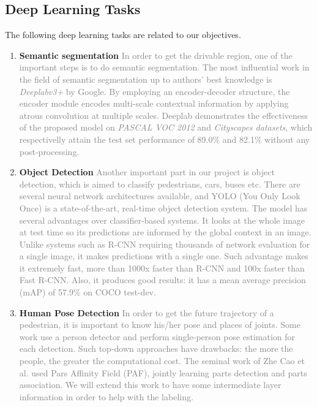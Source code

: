 \subsection{Deep Learning Tasks}
The following deep learning tasks are related to our objectives.
\begin{enumerate}
    \item \textbf{Semantic segmentation}\newline
\textcolor{gray}{In order to get the drivable region, one of the important steps is to do semantic segmentation.  The most influential work in the field of semantic segmentation up to authors' best knowledge is \textit{Deeplabv3+} by Google. By employing an encoder-decoder structure, the encoder module encodes multi-scale contextual information by
applying atrous convolution at multiple scales. Deeplab demonstrates the effectiveness of the proposed model on \textit{PASCAL VOC 2012} and \textit{Cityscapes datasets}, which respectivelly attain the test set performance of 89.0\% and 82.1\% without any post-processing. \cite{Chen2018DeepLab}}

\item \textbf{Object Detection}\newline
\textcolor{gray}{Another important part in our project is object detection, which is aimed to classify pedestrians, cars, buses etc. There are several neural network architectures available, and YOLO (You Only Look Once) \cite{Redmon2018YOLOv3} is a state-of-the-art, real-time object detection system. 
The model has several advantages over classifier-based systems. It looks at the whole image at test time so its predictions are informed by the global context in an image. Unlike systems such as R-CNN requiring thousands of network evaluation for a single image, it makes predictions with a single one. Such advantage makes it extremely fast, more than 1000x faster than R-CNN and 100x faster than Fast R-CNN. Also, it produces good results: it has a mean average precision (mAP) of 57.9\% on COCO test-dev. }

\item \textbf{Human Pose Detection}\newline
\textcolor{gray}{In order to get the future trajectory of a pedestrian, it is important to know his/her pose and places of joints. Some work use a person detector and perform single-person pose estimation for each detection. Such top-down approaches have drawbacks: the more the people, the greater the computational cost. The
seminal work of Zhe Cao et al. \cite{Cao2016Realtime} used Pars Affinity Field (PAF), jointly learning parts detection and parts association. We will extend this work to have some intermediate layer information in order to help with the labeling. }
\end{enumerate}

